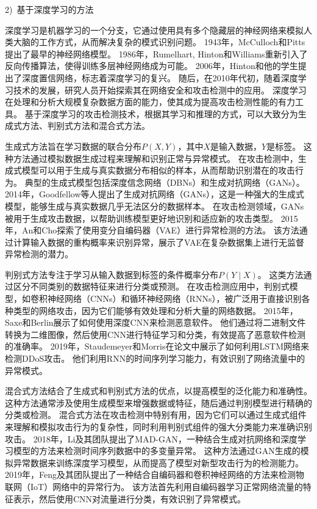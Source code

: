 2)~基于深度学习的方法\par
深度学习是机器学习的一个分支，它通过使用具有多个隐藏层的神经网络来模拟人类大脑的工作方式，从而解决复杂的模式识别问题。
1943年，McCulloch和Pitts提出了最早的神经网络模型。
1986年，Rumelhart, Hinton和Williams重新引入了反向传播算法，使得训练多层神经网络成为可能。
2006年，Hinton和他的学生提出了深度置信网络，标志着深度学习的复兴。
随后，在2010年代初，随着深度学习技术的发展，研究人员开始探索其在网络安全和攻击检测中的应用。
深度学习在处理和分析大规模复杂数据方面的能力，使其成为提高攻击检测性能的有力工具。
基于深度学习的攻击检测技术，根据其学习和推理的方式，可以大致分为生成式方法、判别式方法和混合式方法。

生成式方法旨在学习数据的联合分布$P(X,Y)$，其中$X$是输入数据，$Y$是标签。
这种方法通过模拟数据生成过程来理解和识别正常与异常模式。
在攻击检测中，生成式模型可以用于生成与真实数据分布相似的样本，从而帮助识别潜在的攻击行为。
典型的生成式模型包括深度信念网络（DBNs）和生成对抗网络（GANs）。
2014年，Goodfellow等人提出了生成对抗网络（GANs）\cite{goodfellow2014generative}，这是一种强大的生成式模型，能够生成与真实数据几乎无法区分的数据样本。
在攻击检测领域，GANs被用于生成攻击数据，以帮助训练模型更好地识别和适应新的攻击类型。
2015年，An和Cho探索了使用变分自编码器（VAE）进行异常检测的方法\cite{an2015variational}。
该方法通过计算输入数据的重构概率来识别异常，展示了VAE在复杂数据集上进行无监督异常检测的潜力。

判别式方法专注于学习从输入数据到标签的条件概率分布$P(Y∣X)$。
这类方法通过区分不同类别的数据特征来进行分类或预测。
在攻击检测应用中，判别式模型，如卷积神经网络（CNNs）和循环神经网络（RNNs），被广泛用于直接识别各种类型的网络攻击，因为它们能够有效处理和分析大量的网络数据。
2015年，Saxe和Berlin展示了如何使用深度CNN来检测恶意软件\cite{saxe2015deep}。
他们通过将二进制文件转换为二维图像，然后使用CNN进行特征学习和分类，有效提高了恶意软件检测的准确率。
2019年，Staudemeyer和Morris\cite{staudemeyer2019applying}在论文中展示了如何利用LSTM网络来检测DDoS攻击。
他们利用RNN的时间序列学习能力，有效识别了网络流量中的异常模式。

混合式方法结合了生成式和判别式方法的优点，以提高模型的泛化能力和准确性。
这种方法通常涉及使用生成模型来增强数据或特征，随后通过判别模型进行精确的分类或检测。
混合式方法在攻击检测中特别有用，因为它们可以通过生成式组件来理解和模拟攻击行为的复杂性，同时利用判别式组件的强大分类能力来准确识别攻击。
2018年，Li及其团队提出了MAD-GAN\cite{li2018mad}，一种结合生成对抗网络和深度学习模型的方法来检测时间序列数据中的多变量异常。
这种方法通过GAN生成的模拟异常数据来训练深度学习模型，从而提高了模型对新型攻击行为的检测能力。
2019年，Feng及其团队提出了一种结合自编码器和卷积神经网络的方法来检测物联网（IoT）网络中的异常行为\cite{feng2019deep}。
该方法首先利用自编码器学习正常网络流量的特征表示，然后使用CNN对流量进行分类，有效识别了异常模式。

